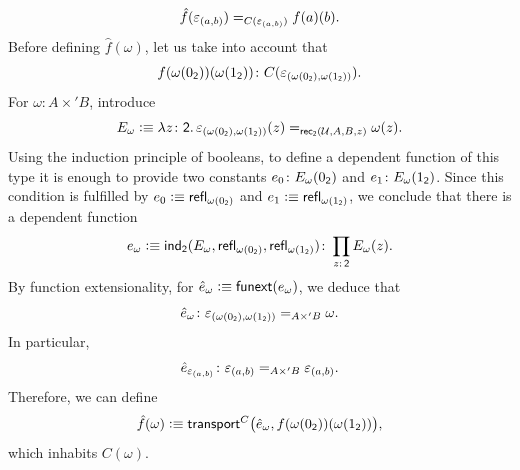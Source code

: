 \begin{solution}
\begin{equation}
        \hat f(\varepsilon_{(a,b)})
        \mathrel{=_{C(\varepsilon_{(a,b)})}}
        f(a)(b).
    \end{equation}
    Before defining $\hat f(\omega)$, let us take into account that 
    \[
        f(\omega(0_{\fun2}))(\omega(1_{\fun2}))
            \colon C(
                \varepsilon_{
                    (
                        \omega(0_{\fun2}),\omega(1_{\fun2})
                    )
                }
                ).
    \]
    For $\omega\colon A\times'B$, introduce
    \[
        E_\omega\defeq\lambda z\colon\fun2.\,
            \varepsilon_{
                (\omega(0_{\fun2}),\omega(1_{\fun2}))
            }(z)
            \eq{\fun{rec}_{\fun2}(\univ,A,B,z)}
            \omega(z).
    \]
    Using the induction principle of booleans, to define a dependent function of this type it is enough to provide two constants $e_0\colon E_\omega(0_{\fun2})$ and $e_1\colon E_\omega(1_{\fun2})$. Since this condition is fulfilled by $e_0\mathrel{\vcentcolon}\equiv\mathsf{refl}_{\omega(0_{\mathsf{2}})}$ and $e_1\mathrel{\vcentcolon}\equiv\mathsf{refl}_{\omega(1_{\mathsf{2}})}$, we conclude that there is a dependent function
    \[
        e_\omega\defeq\fun{ind}_{\fun2}(E_\omega,
            \fun{refl}_{\omega(0_{\fun2})},
            \fun{refl}_{\omega(1_{\fun2})})
            \colon\prod_{z\colon\fun2}E_\omega(z).
    \]
    By function extensionality, for $\hat e_\omega\mathrel{\vcentcolon}\equiv\mathsf{funext}(e_\omega)$, we deduce that
    \[
        \hat e_\omega\colon
            \varepsilon_{
                (\omega(0_{\fun2}),\omega(1_{\fun2}))
            }
            \eq{A\times'B}
            \omega.
    \]
    In particular,
    \begin{equation}\label{eq:proposition-base-condition-2}
        \hat e_{\varepsilon_{(a,b)}}\colon
            \varepsilon_{(a,b)}
            \eq{A\times'B}
            \varepsilon_{(a,b)}.
    \end{equation}
    Therefore, we can define
    \[
        \hat f(\omega)\mathrel{\vcentcolon}\equiv\mathsf{transport}^C
            \bigl(
                \hat e_\omega,
                f(\omega(0_{\mathsf{2}}))(\omega(1_{\mathsf{2}}))
            \bigr),
    \]
    which inhabits $C(\omega)$.
    

\end{solution}
